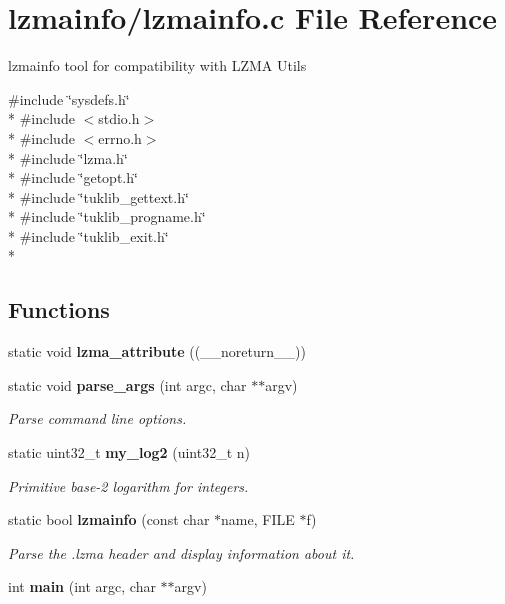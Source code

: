 \section{lzmainfo/lzmainfo.c File Reference}
\label{lzmainfo_8c}


lzmainfo tool for compatibility with L\-Z\-M\-A Utils  


{\ttfamily \#include \char`\"{}sysdefs.\-h\char`\"{}}\\*
{\ttfamily \#include $<$stdio.\-h$>$}\\*
{\ttfamily \#include $<$errno.\-h$>$}\\*
{\ttfamily \#include \char`\"{}lzma.\-h\char`\"{}}\\*
{\ttfamily \#include \char`\"{}getopt.\-h\char`\"{}}\\*
{\ttfamily \#include \char`\"{}tuklib\-\_\-gettext.\-h\char`\"{}}\\*
{\ttfamily \#include \char`\"{}tuklib\-\_\-progname.\-h\char`\"{}}\\*
{\ttfamily \#include \char`\"{}tuklib\-\_\-exit.\-h\char`\"{}}\\*
\subsection*{Functions}
\begin{DoxyCompactItemize}
\item 
static void {\bfseries lzma\-\_\-attribute} ((\-\_\-\-\_\-noreturn\-\_\-\-\_\-))\label{lzmainfo_8c_a1957d0c8f6ec2eb4950e67226425ee7c}

\item 
static void {\bf parse\-\_\-args} (int argc, char $\ast$$\ast$argv)
\begin{DoxyCompactList}\small\item\em Parse command line options. \end{DoxyCompactList}\item 
static uint32\-\_\-t {\bf my\-\_\-log2} (uint32\-\_\-t n)
\begin{DoxyCompactList}\small\item\em Primitive base-\/2 logarithm for integers. \end{DoxyCompactList}\item 
static bool {\bf lzmainfo} (const char $\ast$name, F\-I\-L\-E $\ast$f)
\begin{DoxyCompactList}\small\item\em Parse the .lzma header and display information about it. \end{DoxyCompactList}\item 
int {\bfseries main} (int argc, char $\ast$$\ast$argv)\label{lzmainfo_8c_a3c04138a5bfe5d72780bb7e82a18e627}

\end{DoxyCompactItemize}



